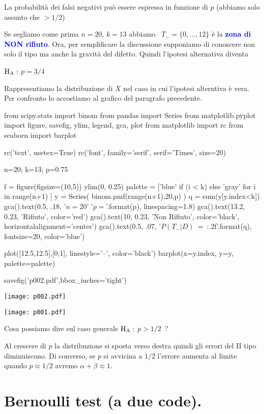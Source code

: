 \documentclass[10pt,openany]{book}
\def\HA{{\rm H_A}}
\def\emph#1{\textcolor{blue}{\textbf{\boldmath #1}}}
\theoremstyle{mio}
\theoremstyle{liscio}
\begin{document}
La probabilità dei falsi negativi può essere espressa in funzione di $p$ (abbiamo solo assunto che $>1/2$)



Se segliamo come prima $n=20$, $k=13$ abbiamo {\color{blue}\boldmath\ $T_-=\{0,\dots,12\}$} è la \emph{zona di NON rifiuto}.
Ora, per semplificare la discussione supponiamo di conoscere non solo il tipo ma anche la gravità del difetto. Quindi l'ipotesi alternativa diventa

$\HA:$ $p=3/4$

Rappresentiamo la distribuzione di $X$ nel caso in cui l'ipotesi alterntiva è vera. Per confronto lo accostiamo al grafico del paragrafo precedente. 


\begin{pycode}
from scipy.stats import binom
from pandas import Series
from matplotlib.pyplot import figure, savefig, ylim, legend, gca, plot
from matplotlib import rc
from seaborn import barplot

rc('text', usetex=True)
rc('font', family='serif', serif='Times', size=20)


n=20; k=13; p=0.75

f = figure(figsize=(10,5))
ylim(0, 0.25)
palette = ['blue' if (i < k) else 'gray' for i in range(n+1) ]
y = Series( binom.pmf(range(n+1),20,p) )
q = sum(y[y.index<k])
gca().text(0.5, .18, '$n=20$\n' '$p={}$'.format(p), linespacing=1.8)
gca().text(13.2, 0.23, 'Rifiuto', color='red')
gca().text(10, 0.23, 'Non Rifiuto', color='black', horizontalalignment='center')
gca().text(0.5, .07, '$P(T_-|D)$\ =\ {:.2f}'.format(q), fontsize=20, color='blue')

plot([12.5,12.5],[0,1], linestyle='--', color='black')
barplot(x=y.index, y=y, palette=palette)

savefig('p002.pdf',bbox_inches='tight')
\end{pycode}
\hfil\texttt{[image: p002.pdf]}

\hfil\texttt{[image: p001.pdf]}

Cosa possiamo dire sul caso generale $\HA:$ $p>1/2$~?

Al crescere di $p$ la distribuzione si sposta verso destra quindi gli errori del II tipo diminuiscono. Di converso, se $p$ si avvicina a $1/2$ l'errore aumenta al limite quando $p\approx 1/2$ avremo $\alpha+\beta\approx 1$.  


\clearpage\section{Bernoulli test (a due code).}
\end{document}
